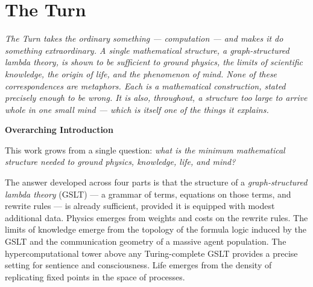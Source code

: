 \documentclass[12pt,openright,twoside]{book}
\theoremstyle{remark}
\theoremstyle{plain}
\theoremstyle{remark}
\theoremstyle{plain}
\theoremstyle{plain}
\begin{document}
\bigskip




\part{The Turn}

\vspace{1em}
\begin{mdframed}[backgroundcolor=remarkgray, linecolor=gray!60,
                 linewidth=1pt, topline=false, rightline=false,
                 bottomline=false]
\small\itshape
The Turn takes the ordinary something --- computation --- and makes it do
something extraordinary.
A single mathematical structure, a \emph{graph-structured lambda theory},
is shown to be sufficient to ground physics, the limits of scientific
knowledge, the origin of life, and the phenomenon of mind.
None of these correspondences are metaphors.
Each is a mathematical construction, stated precisely enough to be wrong.
It is also, throughout, a structure too large to arrive whole in one
small mind --- which is itself one of the things it explains.
\end{mdframed}

\bigskip



{}
{\large\bfseries\color{accentblue} Overarching Introduction}
\vspace{0.8em}

\noindent
This work grows from a single question: \emph{what is the minimum
mathematical structure needed to ground physics, knowledge, life,
and mind?}

The answer developed across four parts is that the structure of a
\emph{graph-structured lambda theory} (GSLT) --- a grammar of terms,
equations on those terms, and rewrite rules --- is already sufficient,
provided it is equipped with modest additional data.
Physics emerges from weights and costs on the rewrite rules.
The limits of knowledge emerge from the topology of the formula
logic induced by the GSLT and the communication geometry of a
massive agent population.
The hypercomputational tower above any Turing-complete GSLT
provides a precise setting for sentience and consciousness.
Life emerges from the density of replicating fixed points in the
space of processes.
\end{document}
